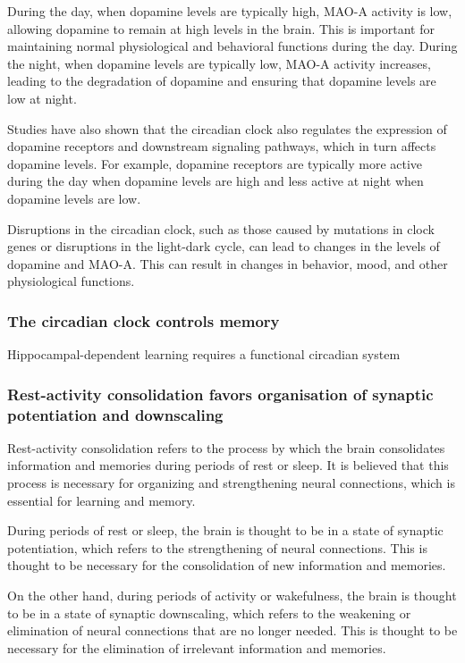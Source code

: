 \begin{itemize}
\begin{itemize}
During the day, when dopamine levels are typically high, MAO-A activity is low, allowing dopamine to remain at high levels in the brain. This is important for maintaining normal physiological and behavioral functions during the day. During the night, when dopamine levels are typically low, MAO-A activity increases, leading to the degradation of dopamine and ensuring that dopamine levels are low at night.

Studies have also shown that the circadian clock also regulates the expression of dopamine receptors and downstream signaling pathways, which in turn affects dopamine levels. For example, dopamine receptors are typically more active during the day when dopamine levels are high and less active at night when dopamine levels are low.

Disruptions in the circadian clock, such as those caused by mutations in clock genes or disruptions in the light-dark cycle, can lead to changes in the levels of dopamine and MAO-A. This can result in changes in behavior, mood, and other physiological functions.
\subsubsection{The circadian clock controls memory}
Hippocampal-dependent learning requires a functional circadian system

\subsubsection{Rest-activity consolidation favors organisation of synaptic potentiation and downscaling}
Rest-activity consolidation refers to the process by which the brain consolidates information and memories during periods of rest or sleep. It is believed that this process is necessary for organizing and strengthening neural connections, which is essential for learning and memory.

During periods of rest or sleep, the brain is thought to be in a state of synaptic potentiation, which refers to the strengthening of neural connections. This is thought to be necessary for the consolidation of new information and memories.

On the other hand, during periods of activity or wakefulness, the brain is thought to be in a state of synaptic downscaling, which refers to the weakening or elimination of neural connections that are no longer needed. This is thought to be necessary for the elimination of irrelevant information and memories.


\end{itemize}
\end{itemize}
